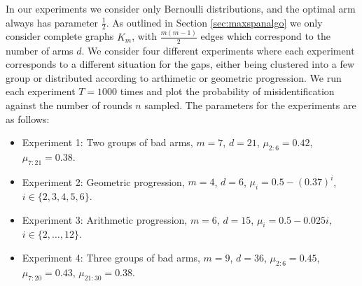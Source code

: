 \documentclass[11.75pt,oneside]{amsart}
\begin{document}
In our experiments we consider only Bernoulli distributions, and the optimal arm always has parameter $\frac{1}{2}$. As outlined in Section \ref{sec:maxspanalgo} we only consider complete graphs $K_{m}$, with $\frac{m(m-1)}{2}$ edges which correspond to the number of arms $d$. We consider four different experiments where each experiment corresponds to a different situation for the gaps, either being clustered into a few group or distributed according to arthimetic or geometric progression. We run each experiment $T=1000$ times and plot the probability of misidentification against the number of rounds $n$ sampled. The parameters for the experiments are as follows:
\vspace{5pt}
\begin{itemize}
	\item Experiment 1: Two groups of bad arms, $m=7$, $d=21$, $\mu_{2:6} = 0.42$, $\mu_{7:21}=0.38$.
	\vspace{2.5pt}
	\item Experiment 2: Geometric progression, $m=4$, $d=6$, $\mu_{i} = 0.5 - (0.37)^i$, $i \in \{2,3,4,5,6\}$.
	\vspace{2.5pt}
	\item Experiment 3: Arithmetic progression, $m=6$, $d=15$, $\mu_{i} = 0.5 - 0.025 i$, $i \in \{2,\hdots,12\}$.
	\vspace{2.5pt}
	\item Experiment 4: Three groups of bad arms, $m=9$, $d=36$, $\mu_{2:6}=0.45$, $\mu_{7:20}=0.43$, $\mu_{21:30}=0.38$.
	\vspace{2.5pt}
\end{itemize}
\end{document}
